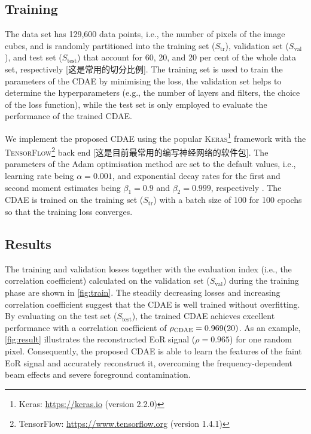 \documentclass[letters,a4paper,fleqn,usenatbib]{mnras}
\newcommand{\R}[1]{\mathrm{#1}}
\begin{document}
\subsection{Training}
\label{sec:training}

The data set has 129,600 data points, i.e., the number of pixels of
the image cubes, and is randomly partitioned into the
training set ($S_{\R{tr}}$), validation set ($S_{\R{val}}$), and
test set ($S_{\R{test}}$) that account for 60, 20, and 20 per cent of
the whole data set, respectively [这是常用的切分比例].
The training set is used to train the parameters of the CDAE by
minimising the loss,
the validation set helps to determine the hyperparameters (e.g., the
number of layers and filters, the choice of the loss function),
while the test set is only employed to evaluate the performance of the
trained CDAE.

We implement the proposed CDAE using the popular \textsc{Keras}\footnote{%
  Keras: \url{https://keras.io} (version 2.2.0)}
framework \citep{keras} with the \textsc{TensorFlow}\footnote{%
TensorFlow: \url{https://www.tensorflow.org} (version 1.4.1)}
back end \citep{tensorflow} [这是目前最常用的编写神经网络的软件包].
The parameters of the Adam optimisation method are set to the default
values, i.e., learning rate being $\alpha = 0.001$, and
exponential decay rates for the first and second moment estimates being
$\beta_1 = 0.9$ and $\beta_2 = 0.999$, respectively \citep{kingma2015}.
The CDAE is trained on the training set ($S_{\R{tr}}$) with a batch size
of 100 for 100 epochs so that the training loss converges.


\subsection{Results}
\label{sec:results}

The training and validation losses together with the evaluation index
(i.e., the correlation coefficient) calculated on the validation set
($S_{\R{val}}$) during the training phase are shown in \autoref{fig:train}.
The steadily decreasing losses and increasing correlation coefficient
suggest that the CDAE is well trained without overfitting.
By evaluating on the test set ($S_{\R{test}}$), the trained CDAE
achieves excellent performance with a correlation coefficient of
$\rho_{\R{CDAE}} = \num{0.969 +- 0.020}$.
As an example, \autoref{fig:result} illustrates the reconstructed EoR
signal ($\rho = 0.965$) for one random pixel.
Consequently, the proposed CDAE is able to learn the features of the
faint EoR signal and accurately reconstruct it, overcoming the
frequency-dependent beam effects and severe foreground contamination.
\end{document}
